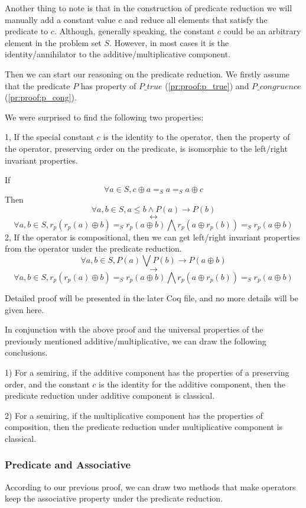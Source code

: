\documentclass[a4paper,12pt,twoside,openright]{report}
\begin{document}
Another thing to note is that in the construction of predicate reduction we will manually add a constant value $c$ and reduce all elements that satisfy the predicate to $c$.
Although, generally speaking, the constant $c$ could be an arbitrary element in the problem set $S$. However, in most cases it is the identity/annihilator to the additive/multiplicative component.

Then we can start our reasoning on the predicate reduction. We firstly assume that the predicate $P$ has property of $P\_true$ (\ref{pr:proof:p_true}) and $P\_congruence$ (\ref{pr:proof:p_cong}). 

We were surprised to find the following two properties:

1, If the special constant $c$ is the identity to the operator, then the property of the operator, preserving order on the predicate, is isomorphic to the left/right invariant properties.

If \[\forall a \in S, c \oplus a =_S a =_S a \oplus c\]
Then
\[\forall a,b \in S, a \leq b \wedge P(a) \rightarrow P(b)\]
\[\longleftrightarrow\]
\[\forall a,b \in S, r_p(r_p(a) \oplus b) =_S r_p(a \oplus b) \bigwedge r_p(a \oplus r_p(b)) =_S r_p(a \oplus b)\]
2, If the operator is compositional, then we can get left/right invariant properties from the operator under the predicate reduction.
\[\forall a,b \in S, P(a) \bigvee P (b) \rightarrow P(a \oplus b)\]
\[\longrightarrow\]
\[\forall a,b \in S, r_p(r_p(a) \oplus b) =_S r_p(a \oplus b) \bigwedge r_p(a \oplus r_p(b)) =_S r_p(a \oplus b)\]

Detailed proof will be presented in the later Coq file, and no more details will be given here.

In conjunction with the above proof and the universal properties of the previously mentioned additive/multiplicative, we can draw the following conclusions.

1) For a semiring, if the additive component has the properties of a preserving order, and the constant $c$ is the identity for the additive component, then the predicate reduction under additive component is classical.

2) For a semiring, if the multiplicative component has the properties of composition, then the predicate reduction under multiplicative component is classical.
\subsubsection{Predicate and Associative}
According to our previous proof, we can draw two methods that make operators keep the associative property under the predicate reduction.
\end{document}
